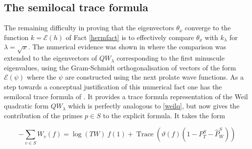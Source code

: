 \documentclass{article}
\def\cE{{\mathcal E}}
\begin{document}
\subsection{The semilocal trace formula}\label{sectsemiloc}
The remaining  difficulty in proving that the eigenvectors $\theta_x$ converge to the function $k=\cE(h)$ of Fact  \ref{hermfact} is to effectively compare $\theta_x$ with $k_\lambda$ for $\lambda=\sqrt x$. The numerical evidence was shown in \cite{VJ} where the comparison was extended to the eigenvectors of $QW_\lambda$ corresponding to the first minuscule eigenvalues, using the Gram-Schmidt orthogonalisation of vectors of the form $\cE(\psi)$ where the $\psi$ are constructed using the next prolate wave functions.\newline
  As a step towards a conceptual justification of this numerical fact one has the semilocal trace formula of \cite{Co-zeta}. It provides a trace formula   representation of the Weil quadratic form $QW_\lambda$ which is perfectly analogous to \eqref{weilq}, but now gives the contribution of the primes $p\in S$ to the explicit formula. It takes the form 
   \begin{graybox}
   \begin{equation}\label{weilqb}
 		-\sum_{v \in S} W_v(f)=\log( TW)\ f(1)+\operatorname{Trace}\left(\vartheta(f)\left(1-P_T^S-\widehat P_W^S\right)		\right)
 			\end{equation} 
 			 \end{graybox} 
\end{document}
